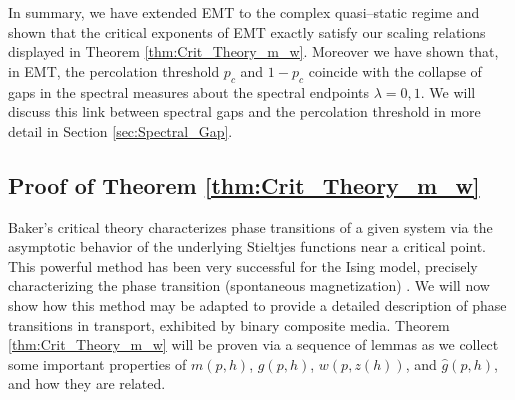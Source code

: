 \documentclass[english,12pt,jmp,graphicx]{revtex4-1}
\newtheorem{definition}{Definition}[section]
\newcommand{\ph}{\hat{\phi}}
\begin{document}
In summary, we have extended EMT to the complex quasi--static regime
and shown that the critical exponents of EMT exactly satisfy our
scaling relations displayed in Theorem
\ref{thm:Crit_Theory_m_w}. Moreover we have shown that, in EMT, the
percolation threshold $p_c$ and $1-p_c$ coincide with the collapse of
gaps in the spectral measures about the spectral endpoints $\lambda=0,1$. We  
will discuss this link between spectral gaps and the percolation
threshold in more detail in Section \ref{sec:Spectral_Gap}.
%
\subsection{Proof of Theorem
  \ref{thm:Crit_Theory_m_w}} \label{sec:Proof_of_Theorem}
%
Baker's critical theory characterizes phase transitions of a given system
via the asymptotic behavior of the underlying Stieltjes functions near a
critical point. This powerful method has been very successful for the
Ising model, precisely characterizing the phase transition
(spontaneous magnetization) \cite{Baker-1990}.
We will now show how this method may be adapted to provide a detailed
description of phase transitions in transport, exhibited by binary
composite media. Theorem \ref{thm:Crit_Theory_m_w} will be proven via
a sequence of lemmas as we collect some important properties of
$m(p,h)$, $g(p,h)$, $w(p,z(h))$, and $\hat{g}(p,h)$, and how they are related.   
%
\end{document}
